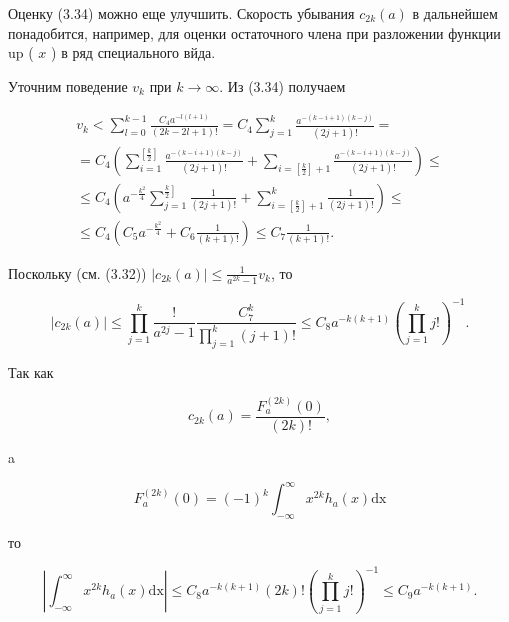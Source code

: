 \documentclass[10pt]{article}
\begin{document}
Оценку (3.34) можно еще улучшить. Скорость убывания $c_{2 k}(a)$ в дальнейшем понадобится, например, для оценки остаточного члена при разложении функции up ( $x$ ) в ряд специального вйда.

Уточним поведение $v_{k}$ при $k \rightarrow \infty$. Из (3.34) получаем

$$
\begin{gathered}
v_{k}<\sum_{l=0}^{k-1} \frac{C_{4} a^{-l(l+1)}}{(2 k-2 l+1)!}=C_{4} \sum_{j=1}^{k} \frac{a^{-(k-i+1)(k-j)}}{(2 j+1)!}= \\
=C_{4}\left(\sum_{i=1}^{\left[\frac{k}{2}\right]} \frac{a^{-(k-i+1)(k-j)}}{(2 j+1)!}+\sum_{i=\left[\frac{k}{2}\right]+1} \frac{a^{-(k-i+1)(k-j)}}{(2 j+1)!}\right) \leqslant \\
\leqslant C_{4}\left(a^{-\frac{k^{2}}{4}} \sum_{j=1}^{\left.\frac{k}{2}\right]} \frac{1}{(2 j+1)!}+\sum_{i=\left[\frac{k}{2}\right]+1}^{k} \frac{1}{(2 j+1)!}\right) \leqslant \\
\leqslant C_{4}\left(C_{5} a^{-\frac{k^{2}}{4}}+C_{6} \frac{1}{(k+1)!}\right) \leqslant C_{7} \frac{1}{(k+1)!} .
\end{gathered}
$$

Поскольку (см. (3.32)) $\left|c_{2 k}(a)\right| \leqslant \frac{1}{a^{2 k}-1} v_{k}$, то


\begin{equation*}
\left|c_{2 k}(a)\right| \leqslant \prod_{j=1}^{k} \frac{!}{a^{2 j}-1} \frac{C_{7}^{k}}{\prod_{j=1}^{k}(j+1)!} \leqslant C_{8} a^{-k(k+1)}\left(\prod_{j=1}^{k} j!\right)^{-1} . \tag{3.35}
\end{equation*}


Так как


\begin{equation*}
c_{2 k}(a)=\frac{F_{a}^{(2 k)}(0)}{(2 k)!}, \tag{3.36}
\end{equation*}


a


\begin{equation*}
F_{a}^{(2 k)}(0)=(-1)^{k} \int_{-\infty}^{\infty} x^{2 k} h_{a}(x) \mathrm{dx} \tag{3.37}
\end{equation*}


то


\begin{equation*}
\left|\int_{-\infty}^{\infty} x^{2 k} h_{a}(x) \mathrm{dx}\right| \leqslant C_{8} a^{-k(k+1)}(2 k)!\left(\prod_{j=1}^{k} j!\right)^{-1} \leqslant C_{9} a^{-k(k+1)} . \tag{3.38}
\end{equation*}
\end{document}
